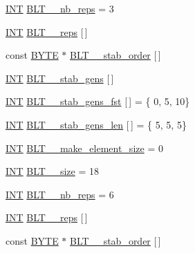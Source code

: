 \begin{DoxyCompactItemize}
\item 
\mbox{\hyperlink{galois_8h_a09fddde158a3a20bd2dcadb609de11dc}{I\+NT}} \mbox{\hyperlink{data___b_l_t_8_c_a9846607d3a0fb24aab17a9a123f0ad68}{B\+L\+T\+\_\+\_\+nb\+\_\+reps}} = 3
\item 
\mbox{\hyperlink{galois_8h_a09fddde158a3a20bd2dcadb609de11dc}{I\+NT}} \mbox{\hyperlink{data___b_l_t_8_c_ac683117abd45ea7068a93136d8fa7711}{B\+L\+T\+\_\+\_\+reps}} \mbox{[}$\,$\mbox{]}
\item 
const \mbox{\hyperlink{galois_8h_ab6cc7b4aeb6ea31aba2b3fbfc83ff5e6}{B\+Y\+TE}} $\ast$ \mbox{\hyperlink{data___b_l_t_8_c_a48fe82fe39753dfb9f591b910464d446}{B\+L\+T\+\_\+\_\+stab\+\_\+order}} \mbox{[}$\,$\mbox{]}
\item 
\mbox{\hyperlink{galois_8h_a09fddde158a3a20bd2dcadb609de11dc}{I\+NT}} \mbox{\hyperlink{data___b_l_t_8_c_a88cef730c30eb29251395a9291f6645a}{B\+L\+T\+\_\+\_\+stab\+\_\+gens}} \mbox{[}$\,$\mbox{]}
\item 
\mbox{\hyperlink{galois_8h_a09fddde158a3a20bd2dcadb609de11dc}{I\+NT}} \mbox{\hyperlink{data___b_l_t_8_c_a62f1218959bc4f348152801def2b5bde}{B\+L\+T\+\_\+\_\+stab\+\_\+gens\+\_\+fst}} \mbox{[}$\,$\mbox{]} = \{ 0, 5, 10\}
\item 
\mbox{\hyperlink{galois_8h_a09fddde158a3a20bd2dcadb609de11dc}{I\+NT}} \mbox{\hyperlink{data___b_l_t_8_c_a922d1d8da39c01fba0d9244ef5b4bcce}{B\+L\+T\+\_\+\_\+stab\+\_\+gens\+\_\+len}} \mbox{[}$\,$\mbox{]} = \{ 5, 5, 5\}
\item 
\mbox{\hyperlink{galois_8h_a09fddde158a3a20bd2dcadb609de11dc}{I\+NT}} \mbox{\hyperlink{data___b_l_t_8_c_a3f04cc829701a630d9e7f6c57b3f581e}{B\+L\+T\+\_\+\_\+make\+\_\+element\+\_\+size}} = 0
\item 
\mbox{\hyperlink{galois_8h_a09fddde158a3a20bd2dcadb609de11dc}{I\+NT}} \mbox{\hyperlink{data___b_l_t_8_c_af527f090acf2d90c858fa942e6155a0b}{B\+L\+T\+\_\+\_\+size}} = 18
\item 
\mbox{\hyperlink{galois_8h_a09fddde158a3a20bd2dcadb609de11dc}{I\+NT}} \mbox{\hyperlink{data___b_l_t_8_c_ab325b80e1e431a23f3cba09487884aac}{B\+L\+T\+\_\+\_\+nb\+\_\+reps}} = 6
\item 
\mbox{\hyperlink{galois_8h_a09fddde158a3a20bd2dcadb609de11dc}{I\+NT}} \mbox{\hyperlink{data___b_l_t_8_c_af823967c0c17812175cbe2bd8d6fdc6b}{B\+L\+T\+\_\+\_\+reps}} \mbox{[}$\,$\mbox{]}
\item 
const \mbox{\hyperlink{galois_8h_ab6cc7b4aeb6ea31aba2b3fbfc83ff5e6}{B\+Y\+TE}} $\ast$ \mbox{\hyperlink{data___b_l_t_8_c_a3a534bfe8e252fc8f6232b843fce90ef}{B\+L\+T\+\_\+\_\+stab\+\_\+order}} \mbox{[}$\,$\mbox{]}

\end{DoxyCompactItemize}
